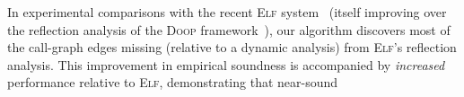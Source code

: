 %
%
%
In experimental comparisons with the recent \textsc{Elf}
system~\cite{ecoop/LiTSX14} (itself improving over the reflection
analysis of the \textsc{Doop} framework~\cite{oopsla/BravenboerS09}),
our algorithm discovers most of the call-graph edges missing (relative
to a dynamic analysis) from \textsc{Elf}'s reflection analysis.  This
improvement in empirical soundness is accompanied by \emph{increased}
performance relative to \textsc{Elf}, demonstrating that near-sound
